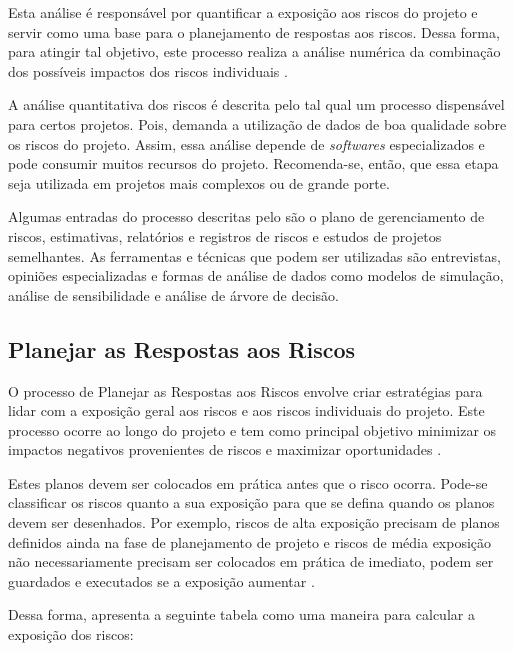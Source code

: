 \documentclass[
    12pt,       %
    openright,      %
    twoside,      %
    a4paper,      %
    english,      %
    french,       %
    spanish,      %
    brazil,       %
    ]{abntex2}
\begin{document}
Esta análise é responsável por quantificar a exposição aos riscos do projeto e servir como uma base para o planejamento de respostas aos riscos. Dessa forma, para atingir tal objetivo, este processo realiza a análise numérica da combinação dos possíveis impactos dos riscos individuais \cite{PMBOK:2017}.

A análise quantitativa dos riscos é descrita pelo  tal qual um processo dispensável para certos projetos. Pois, demanda a utilização de dados de boa qualidade sobre os riscos do projeto. Assim, essa análise depende de \textit{softwares} especializados e pode consumir muitos recursos do projeto. Recomenda-se, então, que essa etapa seja utilizada em projetos mais complexos ou de grande porte. 

Algumas entradas do processo descritas pelo 
são o plano de gerenciamento de riscos, estimativas, relatórios e registros de riscos e estudos de projetos semelhantes. As ferramentas e técnicas que podem ser utilizadas são entrevistas, opiniões especializadas e formas de análise de dados como modelos de simulação, análise de sensibilidade e análise de árvore de decisão. 

\subsection{Planejar as Respostas aos Riscos}

O processo de Planejar as Respostas aos Riscos envolve criar estratégias para lidar com a exposição geral aos riscos e aos riscos individuais do projeto. Este processo ocorre ao longo do projeto e tem como principal objetivo minimizar os impactos negativos provenientes de riscos e maximizar oportunidades \cite{PMBOK:2017}.

Estes planos devem ser colocados em prática antes que o risco ocorra. Pode-se classificar os riscos quanto a sua exposição para que se defina quando os planos devem ser desenhados. Por exemplo, riscos de alta exposição precisam de planos definidos ainda na fase de planejamento de projeto e riscos de média exposição não necessariamente precisam ser colocados em prática de imediato, podem ser guardados e executados se a exposição aumentar \cite{WAZLAWICK:2013}.

Dessa forma,  apresenta a seguinte tabela como uma maneira para calcular a exposição dos riscos:
\end{document}
